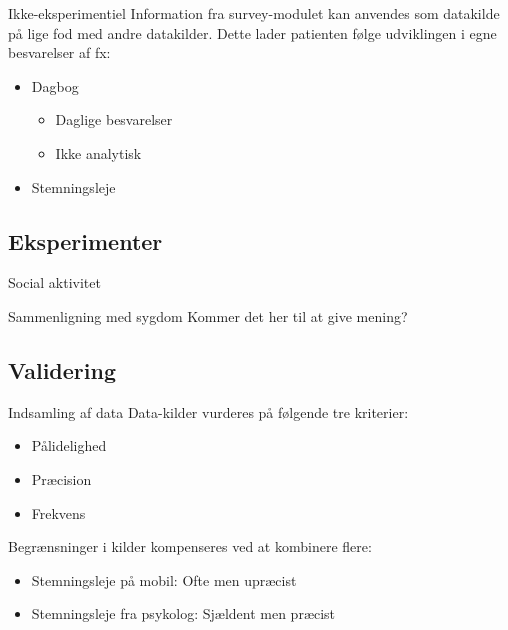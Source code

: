\begin{frame}{Ikke-eksperimentiel}
Information fra survey-modulet kan anvendes som datakilde på lige fod med andre datakilder.
Dette lader patienten følge udviklingen i egne besvarelser af fx:
\begin{itemize}
\pause
\item Dagbog
\begin{itemize}
\item Daglige besvarelser
\item Ikke analytisk
\end{itemize}
\pause
\item Stemningsleje\\

\mygraph{\gstem{}}
\end{itemize}
\end{frame}

\subsection{Eksperimenter}

\begin{frame}{Social aktivitet}
\end{frame}

\begin{frame}{Sammenligning med sygdom}
Kommer det her til at give mening?\\
\end{frame}

\subsection{Validering}
\begin{frame}{Indsamling af data}
Data-kilder vurderes på følgende tre kriterier:
\begin{itemize}
\item Pålidelighed
\item Præcision
\item Frekvens
\end{itemize}\pause
Begrænsninger i kilder kompenseres ved at kombinere flere:
\begin{itemize}
\item Stemningsleje på mobil: Ofte men upræcist
\item Stemningsleje fra psykolog: Sjældent men præcist
\end{itemize}
\end{frame}

